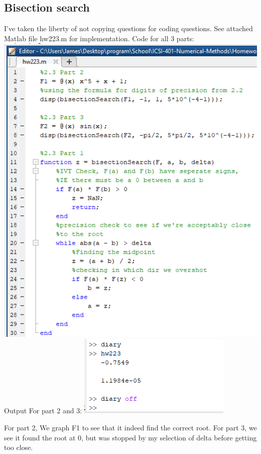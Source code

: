 \documentclass{article}
\begin{document}
\subsection{Bisection search}
I've taken the liberty of not copying questions for coding questions. See attached Matlab file hw223.m for implementation.
\newline
Code for all 3 parts:
\newline
\includegraphics[scale=0.7]{Homework2/2.3code.png}
\newpage
Output For part 2 and 3:
\newline
\includegraphics{Homework2/2.3diary.png}
\newline

For part 2, We graph F1 to see that it indeed find the correct root. 
For part 3, we see it found the root at 0, but was stopped by my selection of delta before getting too close.
\end{document}
